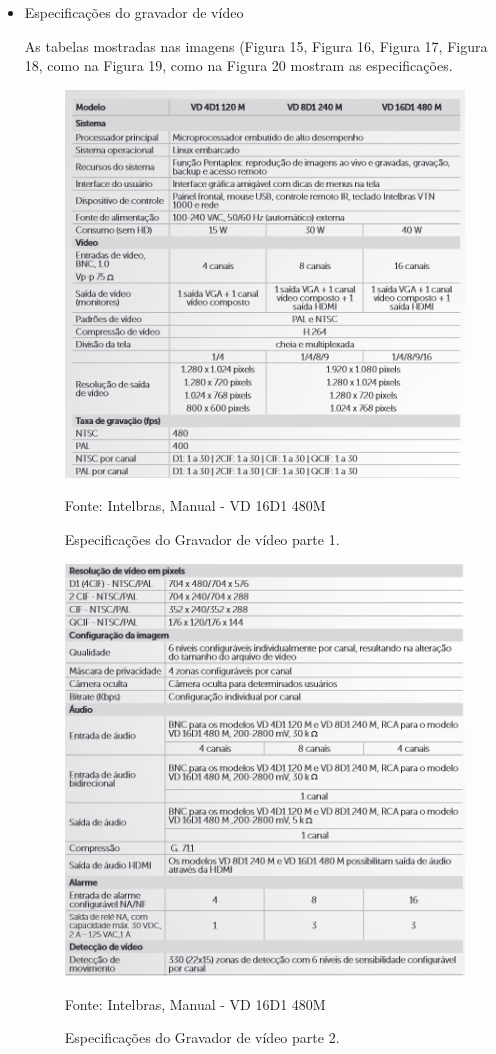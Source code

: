 \begin{itemize}
	\begin{itemize}
		\item Especificações do gravador de vídeo
		
		As tabelas mostradas nas imagens (Figura 15, Figura 16, Figura 17, Figura 18, como na Figura 19, como na Figura 20 mostram as especificações.
		
	\begin{figure}[H]
	 \centering
	\label{Especificações do Gravador de vídeo parte 1}
	 \includegraphics[keepaspectratio=true,scale=0.8]{monitoramento/15.png}
	 \caption{Especificações do Gravador de vídeo parte 1.}
	 \small{Fonte: Intelbras, Manual - VD 16D1 480M}
	\end{figure}
	
	\begin{figure}[H]
	 \centering
	\label{Especificações do Gravador de vídeo parte 2}
	 \includegraphics[keepaspectratio=true,scale=0.8]{monitoramento/16.png}
	 \caption{Especificações do Gravador de vídeo parte 2.}
	 \small{Fonte: Intelbras, Manual - VD 16D1 480M}
	\end{figure}
	

\end{itemize}
\end{itemize}
